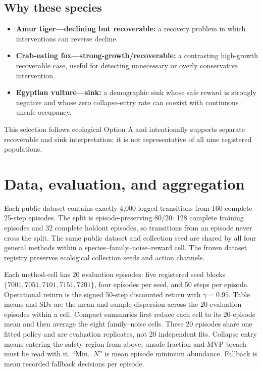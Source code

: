\documentclass[10pt]{article}
\begin{document}
\subsection{Why these species}
\begin{itemize}
\item \textbf{Amur tiger---declining but recoverable:} a recovery problem in which interventions
can reverse decline.
\item \textbf{Crab-eating fox---strong-growth/recoverable:} a contrasting high-growth recoverable
case, useful for detecting unnecessary or overly conservative intervention.
\item \textbf{Egyptian vulture---sink:} a demographic sink whose safe reward is strongly negative
and whose zero collapse-entry rate can coexist with continuous unsafe occupancy.
\end{itemize}
This selection follows ecological Option A and intentionally supports separate recoverable and sink
interpretation; it is not representative of all nine registered populations.

\section{Data, evaluation, and aggregation}
Each public dataset contains exactly 4,000 logged transitions from 160 complete 25-step episodes.
The split is episode-preserving 80/20: 128 complete training episodes and 32 complete holdout
episodes, so transitions from an episode never cross the split. The same public dataset and
collection seed are shared by all four general methods within a species--family--noise--reward cell.
The frozen dataset registry preserves ecological collection seeds and action channels.

Each method-cell has 20 evaluation episodes: five registered seed blocks
\(\{7001,7051,7101,7151,7201\}\), four episodes per seed, and 50 steps per episode.
Operational return is the signed 50-step discounted return with \(\gamma=0.95\). Table means and SDs
are the mean and sample dispersion across the 20 evaluation episodes within a cell. Compact
summaries first reduce each cell to its 20-episode mean and then average the eight family--noise
cells. These 20 episodes share one fitted policy and are evaluation replicates, not 20 independent
fits. Collapse entry means entering the safety region from above; unsafe fraction and MVP breach
must be read with it. ``Min.\ \(N\)'' is mean episode minimum abundance. Fallback is mean recorded
fallback decisions per episode.
\end{document}
